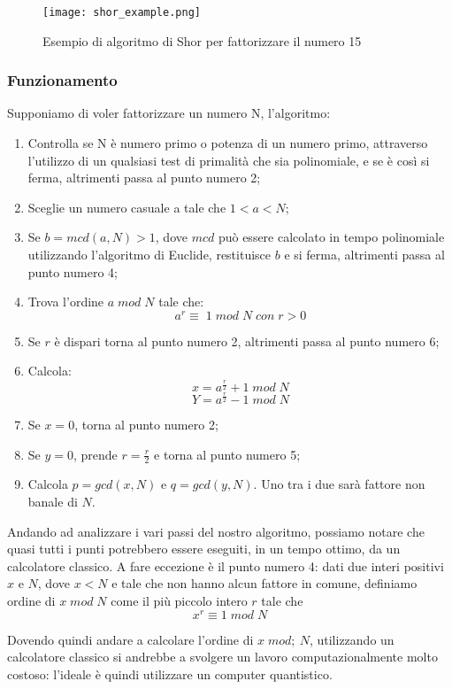 \begin{figure}[h]
  \centering
  \texttt{[image: shor\_example.png]}
  \caption{Esempio di algoritmo di Shor per fattorizzare il numero 15}
  \label{fig:shor_example}
\end{figure}

\subsubsection{Funzionamento}
Supponiamo di voler fattorizzare un numero N, l'algoritmo:
\begin{enumerate}
  \item Controlla se N è numero primo o potenza di un numero primo, attraverso l'utilizzo di un qualsiasi test di primalità che sia polinomiale, e se è così si ferma, altrimenti passa al punto numero 2;
  \item Sceglie un numero casuale a tale che \(1 < a < N\);
  \item Se \(b = mcd\left(a, N\right) > 1\), dove \(mcd\) può essere calcolato in tempo polinomiale utilizzando l'algoritmo di Euclide, restituisce \(b\) e si ferma, altrimenti passa al punto numero 4;
  \item Trova l'ordine \(a \; mod \; N\) tale che: \[a^r \equiv \; 1 \; mod \; N \; con \; r>0\]
  \item Se \(r\) è dispari torna al punto numero 2, altrimenti passa al punto numero 6;
  \item Calcola: 
    \[x = a^{\frac{r}{2}} + 1 \; mod \; N\]
    \[Y = a^{\frac{r}{2}} - 1 \; mod \; N\]
  \item Se \(x = 0\), torna al punto numero 2;
  \item Se \(y = 0\), prende \(r = \frac{r}{2}\) e torna al punto numero 5;
  \item Calcola \(p = gcd(x, N)\) e \(q = gcd(y, N)\). Uno tra i due sarà fattore non banale di \(N\).
\end{enumerate}

Andando ad analizzare i vari passi del nostro algoritmo, possiamo notare che quasi tutti i punti potrebbero essere eseguiti, in un tempo ottimo, da un calcolatore classico. A fare eccezione è il punto numero 4: dati due interi positivi \(x\) e \(N\), dove \(x < N\) e tale che non hanno alcun fattore in comune, definiamo ordine di \(x \; mod \; N\) come il più piccolo intero \(r\) tale che 
\[ x^r \equiv 1 \; mod \; N\]

Dovendo quindi andare a calcolare l'ordine di \(x \; mod ;\ N\), utilizzando un calcolatore classico si andrebbe a svolgere un lavoro computazionalmente molto costoso: l'ideale è quindi utilizzare un computer quantistico.


